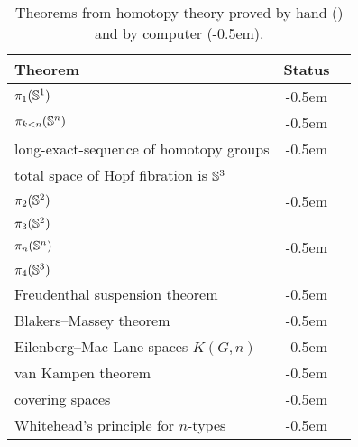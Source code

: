 {
\newcommand{\humancheck}{\ding{52}}
\newcommand{\computercheck}{\ding{52}\kern-0.5em\ding{52}}
\begin{table}[htb]
  \centering
\begin{tabular}{lcc}
\toprule
Theorem         & Status \\
\midrule
$\pi_1(\mathbb{S} ^1)$                     & \computercheck \\
$\pi_{k<n}(\mathbb{S} ^n)$                  & \computercheck \\
long-exact-sequence of homotopy groups & \computercheck    \\
total space of Hopf fibration is $\mathbb{S} ^3$ & \humancheck    \\
$\pi_2(\mathbb{S} ^2)$                     & \computercheck \\
$\pi_3(\mathbb{S} ^2)$                     & \humancheck    \\
$\pi_n(\mathbb{S} ^n)$                     & \computercheck \\
$\pi_4(\mathbb{S} ^3)$                     & \humancheck    \\
Freudenthal suspension theorem      & \computercheck \\
Blakers--Massey theorem              & \computercheck \\
Eilenberg--Mac Lane spaces $K(G,n)$ & \computercheck \\
van Kampen theorem                & \computercheck \\
covering spaces                     & \computercheck \\
Whitehead's principle for $n$-types & \computercheck \\
\bottomrule
\end{tabular}
\caption{Theorems from homotopy theory proved by
  hand (\humancheck) and by computer (\computercheck).}
  \label{tab:theorems}
\end{table}
}

